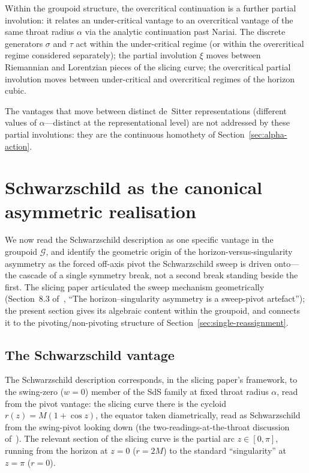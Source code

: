 \documentclass[11pt,a4paper]{article}
\theoremstyle{definition}
\begin{document}
Within the groupoid structure, the overcritical continuation is a further partial involution: it relates an under-critical vantage to an overcritical vantage of the same throat radius $\alpha$ via the analytic continuation past Nariai. The discrete generators $\sigma$ and $\tau$ act within the under-critical regime (or within the overcritical regime considered separately); the partial involution $\xi$ moves between Riemannian and Lorentzian pieces of the slicing curve; the overcritical partial involution moves between under-critical and overcritical regimes of the horizon cubic.

The vantages that move between distinct de~Sitter representations (different values of $\alpha$---distinct at the representational level) are not addressed by these partial involutions: they are the continuous homothety of Section~\ref{sec:alpha-action}.

\section{Schwarzschild as the canonical asymmetric realisation}\label{sec:schwarzschild}

We now read the Schwarzschild description as one specific vantage in the groupoid $\mathcal{G}$, and identify the geometric origin of the horizon-versus-singularity asymmetry as the forced off-axis pivot the Schwarzschild sweep is driven onto---the cascade of a single symmetry break, not a second break standing beside the first. The slicing paper articulated the sweep mechanism geometrically (Section~8.3 of~\cite{JanzenSlicing}, ``The horizon--singularity asymmetry is a sweep-pivot artefact''); the present section gives its algebraic content within the groupoid, and connects it to the pivoting/non-pivoting structure of Section~\ref{sec:single-reassignment}.

\subsection{The Schwarzschild vantage}\label{sec:schwarzschild-vantage}

The Schwarzschild description corresponds, in the slicing paper's framework, to the swing-zero ($w=0$) member of the SdS family at fixed throat radius $\alpha$, read from the pivot vantage: the slicing curve there is the cycloid $r(z)=M(1+\cos z)$, the equator taken diametrically, read as Schwarzschild from the swing-pivot looking down (the two-readings-at-the-throat discussion of~\cite{JanzenSlicing}). The relevant section of the slicing curve is the partial arc $z\in[0,\pi]$, running from the horizon at $z=0$ ($r=2M$) to the standard ``singularity'' at $z=\pi$ ($r=0$).
\end{document}
